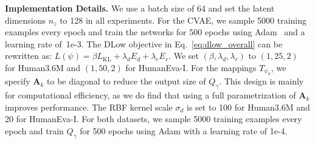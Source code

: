 \documentclass[runningheads]{llncs}
\begin{document}
	\vspace{1mm}
	\noindent\textbf{Implementation Details.} We use a batch size of 64 and set the latent dimensions $n_z$ to 128 in all experiments. For the CVAE, we sample 5000 training examples every epoch and train the networks for 500 epochs using Adam~\cite{kingma2014adam} and a learning rate of~\mbox{1e-3}. The DLow objective in Eq.~\eqref{eq:dlow_overall} can be rewritten as: $L(\psi) = \beta L_\text{KL} + \lambda_d E_d + \lambda_r E_r$. We set $(\beta, \lambda_d, \lambda_r)$ to $(1, 25, 2)$ for Human3.6M and $(1, 50, 2)$ for HumanEva-I. For the mappings $T_{\psi_k}$, we specify $\mathbf{A}_k$ to be diagonal to reduce the output size of $Q_\gamma$. This design is mainly for computational efficiency, as we do find that using a full parametrization of $\mathbf{A}_k$ improves performance. The RBF kernel scale $\sigma_d$ is set to 100 for Human3.6M and 20 for HumanEva-I. For both datasets, we sample 5000 training examples every epoch and train $Q_\gamma$ for 500 epochs using Adam with a learning rate of 1e-4.
	
\end{document}
